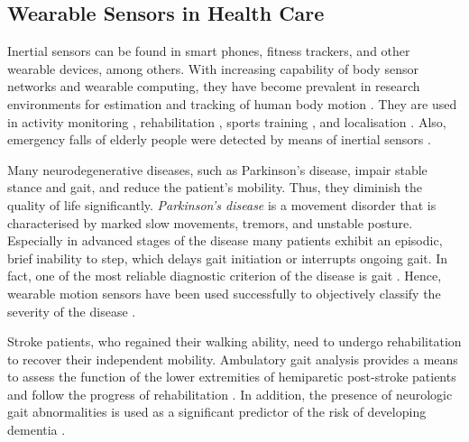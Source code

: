\subsection{Wearable Sensors in Health Care}\label{sec:MARG_sensors_medical}

Inertial sensors can be found in smart phones, fitness trackers, and other wearable devices, among others. With increasing capability of body sensor networks and wearable computing, they have become prevalent in research environments for estimation and tracking of human body motion \cite{bennett_motion_2014}. They are used in activity monitoring \cite{veltink_detection_96, najafi_ambulatory_03, ermes_sports_08}, rehabilitation \cite{giggins_rehabilitation_13, lupinski_ligament_11}, sports training \cite{bonnet_squat_13, ermes_sports_08}, and localisation \cite{hoflinger_localization_13, Bennett_distance_13}. Also, emergency falls of elderly people were detected by means of inertial sensors \cite{bourke_threshold-based_2008, bourke_assessment-waist_2010, bourke_fall_detection_2008}.

Many neurodegenerative diseases, such as Parkinson's disease, impair stable stance and gait, and reduce the patient's mobility. Thus, they diminish the quality of life significantly. \emph{Parkinson's disease} is a movement disorder that is characterised by marked slow movements, tremors, and unstable posture. Especially in advanced stages of the disease many patients exhibit an episodic, brief inability to step, which delays gait initiation or interrupts ongoing gait. In fact, one of the most reliable diagnostic criterion of the disease is gait \cite{tao_gait_2012}. Hence, wearable motion sensors have been used successfully to objectively classify the severity of the disease \cite{mancini_anticipatory_2009, palmerini_feature_2011, klerk_long-term_2009}.

Stroke patients, who regained their walking ability, need to undergo rehabilitation to recover their independent mobility. Ambulatory gait analysis provides a means to assess the function of the lower extremities of hemiparetic post-stroke patients and follow the progress of rehabilitation \cite{tao_gait_2012, saremi_reliability_2006}. In addition, the presence of neurologic gait abnormalities is used as a significant predictor of the risk of developing dementia \cite{verghese_dementia_2002}.

